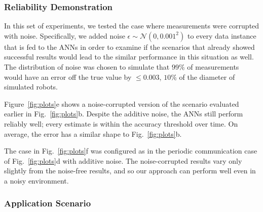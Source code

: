 \documentclass[letterpaper, 10 pt, conference]{ieeeconf}  %
\begin{document}
	\subsubsection{Reliability Demonstration}
	\label{sec:reliabilitydemo}
	
	
	
	In this set of experiments, we tested the case where measurements were
	corrupted with noise. Specifically, we added noise $\epsilon \sim
	\mathcal{N}(0, 0.001^{2})$ to every data instance that is fed to the
	ANNs in order to examine if the scenarios that already showed successful
	results would lead to the similar performance in this situation as well.
	The distribution of noise was chosen to simulate that $99\%$ of
	measurements would have an error off the true value by $\leq 0.003$,
	$10\%$ of the diameter of simulated robots.
	
	Figure~\ref{fig:plots}e shows a noise-corrupted version of the
	scenario evaluated earlier in Fig.~\ref{fig:plots}b. Despite the
	additive noise, the ANNs still perform reliably well; every estimate is
	within the accuracy threshold over time. On average, the error
	has a similar shape to Fig.~\ref{fig:plots}b.
	
	The case in Fig.~\ref{fig:plots}f was configured as in the periodic
	communication case of Fig.~\ref{fig:plots}d with additive noise. The
	noise-corrupted results vary only slightly from the noise-free results,
	and so our approach can perform well even in a noisy environment.
	
	\subsubsection{Application Scenario}
	\label{sec:appscenario}
	
\end{document}
